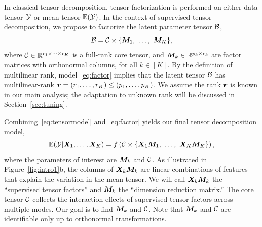 \documentclass[12pt]{article}
\theoremstyle{plain}
\theoremstyle{definition}
\begin{document}
In classical tensor decomposition, tensor factorization is performed on either data tensor $\mathcal{Y}$ or mean tensor $\mathbb{E}(\mathcal{Y})$. In the context of supervised tensor decomposition, we propose to factorize the latent parameter tensor $\mathcal{B}$, 
\begin{equation}\label{eq:factor}
\mathcal{B}=\mathcal{C}\times\{\bm M_1,\ \ldots,\ \bm M_K\},
\end{equation}
where $\mathcal{C}\in\mathbb{R}^{r_1\times \cdots \times r_K}$ is a full-rank core tensor, and $\bm M_k\in\mathbb{R}^{p_k\times r_k}$ are factor matrices with orthonormal columns, for all $k\in[K]$. By the definition of multilinear rank, model~\eqref{eq:factor} implies that the latent tensor $\mathcal{B}$ has multilinear-rank $\bm{r}=(r_1,\ldots,r_K)\leq (p_1,\ldots,p_K)$. We assume the rank $\bm{r}$ is known in our main analysis; the adaptation to unknown rank will be discussed in Section~\ref{sec:tuning}.

Combining~\eqref{eq:tensormodel} and~\eqref{eq:factor} yields our final tensor decomposition model,
\begin{equation}\label{eq:decomp}
\mathbb{E}(\tY|\mX_1,\ldots,\mX_K) = f\left(\tC\times\{\mX_1\mM_1,\ \ldots,\ \mX_K\mM_K\}\right),
\end{equation}
where the parameters of interest are $\bm M_k$ and $\mathcal{C}$. As illustrated in Figure~\ref{fig:intro1}b, the columns of $\bm X_k\bm M_k$ are linear combinations of features that explain the variation in the mean tensor. We will call $\bm X_k\bm M_k$ the ``supervised tensor factors'' and $\bm M_k$ the ``dimension reduction matrix.'' The core tensor $\mathcal{C}$ collects the interaction effects of supervised tensor factors across multiple modes. Our goal is to find $\bm M_k$ and $\mathcal{C}$. Note that  $\bm M_k$ and $\mathcal{C}$ are identifiable only up to orthonormal transformations. 
\end{document}

